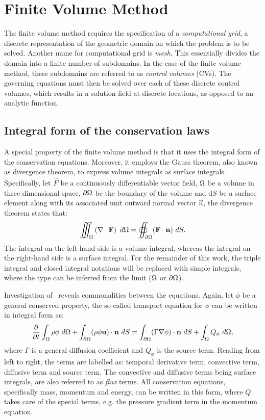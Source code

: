 \section{Finite Volume Method}
\label{sec:fv}
%
%
The finite volume method requires the specification of a \textit{computational grid}, a discrete representation of the geometric domain on which the problem is to be solved. Another name for computational grid is \textit{mesh}. This essentially divides the domain into a finite number of subdomains. In the case of the finite volume method, these subdomains are referred to as \textit{control volumes} (CVs). The governing equations must then be solved over each of these discrete control volumes, which results in a solution field at discrete locations, as opposed to an analytic function.

\subsection{Integral form of the conservation laws}
A special property of the finite volume method is that it uses the integral form of the conservation equations. Moreover, it employs the Gauss theorem, also known as divergence theorem, to express volume integrals as surface integrals. Specifically, let $\vec{F}$ be a continuously differentiable vector field, $\Omega$ be a volume in three-dimensional space, $\partial \Omega$ be the boundary of the volume and $\text{d}S$ be a surface element along with its associated unit outward normal vector $\vec{n}$, the divergence theorem states that:
\begin{equation*}
    \iiint_{\Omega} \left( \nabla \cdot \mathbf{F} \right)~d\Omega =
        \oiint_{\partial \Omega} (\mathbf{F}\cdot\mathbf{n})~dS.
\end{equation*}
The integral on the left-hand side is a volume integral, whereas the integral on the right-hand side is a surface integral. For the remainder of this work, the triple integral and closed integral notations will be replaced with simple integrals, where the type can be inferred from the limit ($\Omega$ or $\partial \Omega$).

Investigation of~ reveals commonalities between the equations. Again, let $\phi$ be a general conserved property, the so-called transport equation for $\phi$ can be written in integral form as:
\begin{equation}
     \frac{\partial }{\partial t} \int_\Omega \rho \phi~d\Omega
        + \int_{\partial \Omega} (\rho \phi \mathbf{u})\cdot\mathbf{n}~dS
        = \int_{\partial \Omega} (\Gamma \nabla \phi)\cdot\mathbf{n}~dS
        + \int_\Omega Q_\phi~d\Omega
    \label{eq:fvtransport},
\end{equation}
where $\Gamma$ is a general diffusion coefficient and $Q_\phi$ is the source term. Reading from left to right, the terms are labelled as: temporal derivative term, convective term, diffusive term and source term. The convective and diffusive terms being surface integrals, are also referred to as \textit{flux} terms. All conservation equations, specifically mass, momentum and energy, can be written in this form, where $Q$ takes care of the special terms, e.g. the pressure gradient term in the momentum equation.

